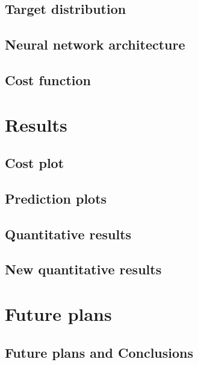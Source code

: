 \documentclass[aspectratio=169, 10pt]{beamer}
\begin{document}
\subsection{Target distribution}


\subsection{Neural network architecture}


\subsection{Cost function}



\section{Results}

\subsection{Cost plot}


\subsection{Prediction plots}


\subsection{Quantitative results}


\subsection{New quantitative results}



\section{Future plans}

\subsection{Future plans and Conclusions}

\end{document}
